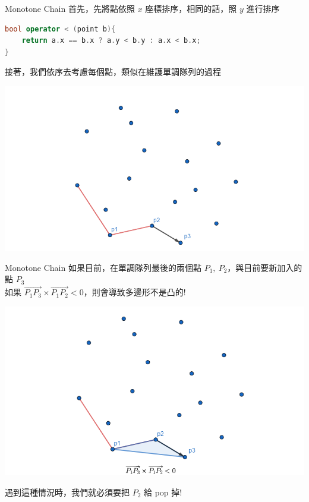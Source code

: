 \documentclass[aspectratio=169]{beamer}
\begin{document}
\begin{frame}[fragile]{Monotone Chain}
    首先，先將點依照 $x$ 座標排序，相同的話，照 $y$ 進行排序
    \begin{lstlisting}[language=C++,basicstyle=\ttfamily\small]
bool operator < (point b){
    return a.x == b.x ? a.y < b.y : a.x < b.x;
}
    \end{lstlisting} \pause
    接著，我們依序去考慮每個點，類似在維護單調隊列的過程
    \begin{center}
        \includegraphics[scale=0.3]{images/monotone_chain_1.png}
    \end{center}
\end{frame}

\begin{frame}[fragile]{Monotone Chain}
    如果目前，在單調隊列最後的兩個點 $P_1, \ P_2$，與目前要新加入的點 $P_3$ \\
    \vspace{2.5mm}
    如果 $\overrightarrow{P_1P_3} \times \overrightarrow{P_1P_2} < 0$，則會導致多邊形不是凸的!
    \begin{center}
        \includegraphics[scale=0.3]{images/monotone_chain_2.png}
    \end{center}
    遇到這種情況時，我們就必須要把 $P_2$ 給 pop 掉!
\end{frame}
\end{document}

